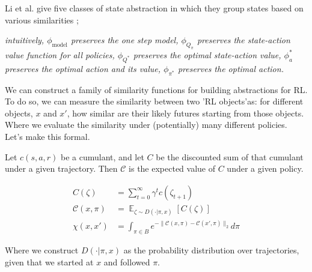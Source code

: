 Li et al. \cite{Littman2006} give five classes of state abstraction in which they group states based on various similarities \footnotemark[20];

\textit{intuitively,
$\phi_{\text{model}}$ preserves the one step model,
$\phi_{Q_{\pi}}$ preserves the state-action value function for all policies,
$\phi_{Q^{* }}$ preserves the optimal state-action value,
$\phi_a^{* }$ preserves the optimal action and its value,
$\phi_{\pi^{* }}$ preserves the optimal action.}

\vspace{5mm}

We can construct a family of similarity functions for building abstractions for RL. To do so, we can measure the
similarity between two 'RL objects'\footnotemark[28] as: for  different objects, $x$ and $x'$,
how similar are their likely futures starting from those objects. Where we evaluate the similarity under (potentially) many different policies.
Let's make this formal.


Let $c(s, a, r)$ be a cumulant, and let $C$ be the discounted sum of that cumulant under a given trajectory\footnotemark[29].
Then $\mathcal C$ is the expected value of $C$ under a given policy.


\begin{align*}
C(\zeta) &= \sum_{t=0}^{\infty} \gamma^{t}  c(\zeta_{t+1}) \\
\mathcal C(x, \pi) &= \mathop{\mathbb E}_{\zeta \sim D(\cdot | \pi, x)} [C(\zeta)] \\
\chi(x, x') &= \int_{\pi \in B} e^{-\parallel \mathcal C(x, \pi) - \mathcal C(x', \pi) \parallel_{2}} d\pi \label{eq:family}
\end{align*}

Where we construct $D(\cdot | \pi, x)$ as the probability distribution over trajectories, given that we started at $x$ and followed $\pi$.

